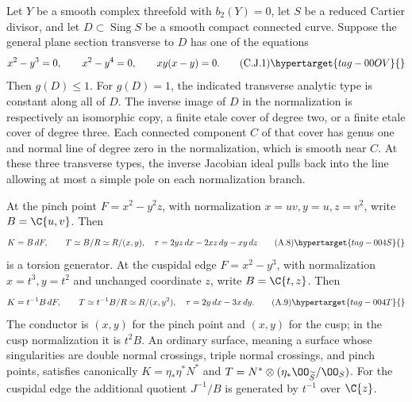 
\begin{proposition}\hypertarget{tag-01FJ}{}\label{cdp:st:C2d}


Let $Y$ be a smooth complex threefold with $b_2(Y)=0$, let $S$ be a reduced Cartier divisor, and let $D\subset\operatorname{Sing}S$ be a smooth compact connected curve. Suppose the general plane section transverse to $D$ has one of the equations
\[
 x^2-y^3=0,\qquad x^2-y^4=0,\qquad xy(x-y)=0.
 \tag{C.J.1}\hypertarget{tag-00OV}{}\label{cdp:eq:C.J.1}
\]
Then $g(D)\le1$. For $g(D)=1$, the indicated transverse analytic type is constant along all of $D$. The inverse image of $D$ in the normalization is respectively an isomorphic copy, a finite etale cover of degree two, or a finite etale cover of degree three. Each connected component $C$ of that cover has genus one and normal line of degree zero in the normalization, which is smooth near $C$. At these three transverse types, the inverse Jacobian ideal pulls back into the line allowing at most a simple pole on each normalization branch.
\end{proposition}

\begin{proposition}\hypertarget{tag-01AI}{}\label{cdp:st:A.2.4}


At the pinch point $F=x^2-y^2z$, with normalization $x=uv,y=u,z=v^2$, write $B=\C\{u,v\}$. Then
\[
 K=B\,dF,\qquad T\simeq B/R\simeq R/(x,y),
\quad \tau=2yz\,dx-2xz\,dy-xy\,dz
\tag{A.8}\hypertarget{tag-004S}{}\label{cdp:eq:A.8}
\]
is a torsion generator. At the cuspidal edge $F=x^2-y^3$, with normalization $x=t^3,y=t^2$ and unchanged coordinate $z$, write $B=\C\{t,z\}$. Then
\[
 K=t^{-1}B\,dF,\qquad
 T\simeq t^{-1}B/R\simeq R/(x,y^2),
 \quad\tau=2y\,dx-3x\,dy.
\tag{A.9}\hypertarget{tag-004T}{}\label{cdp:eq:A.9}
\]
The conductor is $(x,y)$ for the pinch point and $(x,y)$ for the cusp; in the cusp normalization it is $t^2B$. An ordinary surface, meaning a surface whose singularities are double normal crossings, triple normal crossings, and pinch points, satisfies canonically $K=\eta_*\eta^*N^*$ and $T=N^*\otimes(\eta_*\OO_{\widetilde S}/\OO_S)$. For the cuspidal edge the additional quotient $J^{-1}/B$ is generated by $t^{-1}$ over $\C\{z\}$.
\end{proposition}

